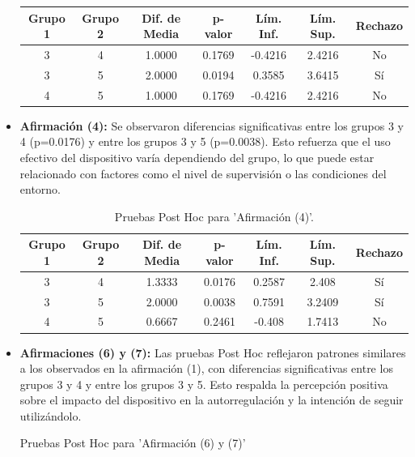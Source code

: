 \documentclass[a4paper,fleqn]{cas-sc}
\begin{document}
\begin{itemize}
\begin{table}[ht]
								\begin{tabularx}{0.75\textwidth}{ccccccc}
									\hline
									\textbf{Grupo 1} & \textbf{Grupo 2} & \textbf{Dif. de Media} & \textbf{p-valor} & \textbf{Lím. Inf.} & \textbf{Lím. Sup.} & \textbf{Rechazo} \\
									\hline
									3 & 4 & 1.0000 & 0.1769 & -0.4216 & 2.4216 & No \\
									3 & 5 & 2.0000 & 0.0194 & 0.3585 & 3.6415 & Sí \\
									4 & 5 & 1.0000 & 0.1769 & -0.4216 & 2.4216 & No \\
									\hline
								\end{tabularx}
								\label{table:posthoc_3}
							\end{table}
								
						\item \textbf{Afirmación (4):} Se observaron diferencias significativas entre los grupos 3 y 4 (p=0.0176) y entre los grupos 3 y 5 (p=0.0038). Esto refuerza que el uso efectivo del dispositivo varía dependiendo del grupo, lo que puede estar relacionado con factores como el nivel de supervisión o las condiciones del entorno.
							\begin{table}[ht]
								\centering
								\caption{Pruebas Post Hoc para 'Afirmación (4)'.}
								\begin{tabularx}{0.75\textwidth}{ccccccc}
									\hline
									\textbf{Grupo 1} & \textbf{Grupo 2} & \textbf{Dif. de Media} & \textbf{p-valor} & \textbf{Lím. Inf.} & \textbf{Lím. Sup.} & \textbf{Rechazo} \\
									\hline
									3 & 4 & 1.3333 & 0.0176 & 0.2587 & 2.408 & Sí \\
									3 & 5 & 2.0000 & 0.0038 & 0.7591 & 3.2409 & Sí \\
									4 & 5 & 0.6667 & 0.2461 & -0.408 & 1.7413 & No \\
									\hline
								\end{tabularx}
								\label{table:posthoc_4}
							\end{table}
						\item \textbf{Afirmaciones (6) y (7):} Las pruebas Post Hoc reflejaron patrones similares a los observados en la afirmación (1), con diferencias significativas entre los grupos 3 y 4 y entre los grupos 3 y 5. Esto respalda la percepción positiva sobre el impacto del dispositivo en la autorregulación y la intención de seguir utilizándolo.
							\begin{table}[ht]
								\centering
								\caption{Pruebas Post Hoc para 'Afirmación (6) y (7)'}

\end{table}
\end{itemize}
\end{document}
